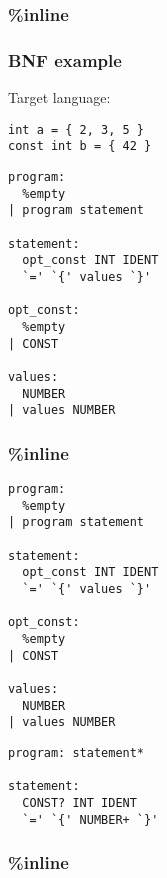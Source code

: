 \begin{frame}
  \frametitle{\%inline}
  \usebox{\codebox}
\end{frame}

\begin{frame}[fragile]
  \frametitle{BNF example}
  Target language:
  \begin{verbatim}
int a = { 2, 3, 5 }
const int b = { 42 }
\end{verbatim}
\end{frame}

\begin{lrbox}{\codebox}
  \begin{tcolorbox}[title=\centering{BNF}\\Bison\hspace{0.45\linewidth} Menhir,sidebyside]%
  \begin{lstlisting}
program:
  %empty
| program statement

statement:
  opt_const INT IDENT
  `=' `{' values `}'

opt_const:
  %empty
| CONST

values:
  NUMBER
| values NUMBER
\end{lstlisting}
\tcblower
  \end{tcolorbox}
\end{lrbox}

\begin{frame}
  \frametitle{\%inline}
  \usebox{\codebox}
\end{frame}
\begin{lrbox}{\codebox}
  \begin{tcolorbox}[title=\centering{BNF}\\Bison\hspace{0.45\linewidth} Menhir,sidebyside]%
  \begin{lstlisting}
program:
  %empty
| program statement

statement:
  opt_const INT IDENT
  `=' `{' values `}'

opt_const:
  %empty
| CONST

values:
  NUMBER
| values NUMBER
\end{lstlisting}
\tcblower
  \begin{lstlisting}
program: statement*

statement:
  CONST? INT IDENT
  `=' `{' NUMBER+ `}'
  \end{lstlisting}
  \end{tcolorbox}
\end{lrbox}

\begin{frame}
  \frametitle{\%inline}
  \usebox{\codebox}
\end{frame}
